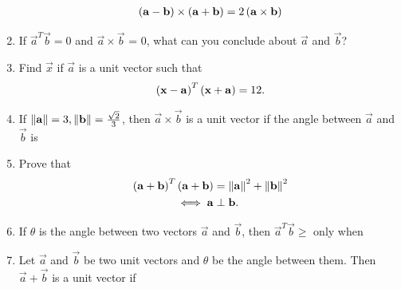 \documentclass[journal,12pt,twocolumn]{IEEEtran}
\renewcommand\thesection{\arabic{section}}
\begin{document}
\begin{enumerate}[label=\thesection.\arabic*.,ref=\thesection.\theenumi]
\begin{align}
\left(\mathbf{a}-\mathbf{b}\right)\times \left(\mathbf{a}+\mathbf{b}\right) = 2\left(\mathbf{a}\times\mathbf{b}\right)
\end{align}
\item If $\vec{a}^T\vec{b} = 0$ and $\vec{a}\times \vec{b}$ = 0, what can you conclude about $\vec{a}$ and $\vec{b}$?
\item Find $\vec{x}$ if  $\vec{a}$ is a unit vector such that
\begin{align}
\left(\mathbf{x}-\mathbf{a}\right)^T\left(\mathbf{x}+\mathbf{a}\right) = 12.
\end{align}
\item If $\left\lVert\mathbf{a}\right\rVert = 3, \left\lVert\mathbf{b}\right\rVert =\frac{\sqrt{2}}{3}$, then $\vec{a}\times \vec{b}$ is a unit vector if the angle between $\vec{a}$ and $\vec{b}$ is 
\begin{enumerate}[itemsep = 2pt]
\end{enumerate}
\item Prove that 
\begin{align}
\left(\mathbf{a}+\mathbf{b}\right)^T\left(\mathbf{a}+\mathbf{b}\right) &= \left\lVert\mathbf{a}\right\rVert^2+\left\lVert\mathbf{b}\right\rVert^2
\\
\iff \mathbf{a}&\perp\mathbf{b}.
\end{align}
\item If $\theta$ is the angle between two vectors $\vec{a}$ and $\vec{b}$, then $\vec{a}^T\vec{b} \ge $ only when 
\begin{enumerate}[itemsep = 2pt]
\end{enumerate}
\item Let $\vec{a}$ and $\vec{b}$ be two unit vectors and $\theta$ be the angle between them.  Then $\vec{a}+\vec{b}$ is a unit vector if 
\begin{enumerate}[itemsep = 2pt]
\begin{multicols}{2}

\end{multicols}
\end{enumerate}
\end{enumerate}
\end{document}
